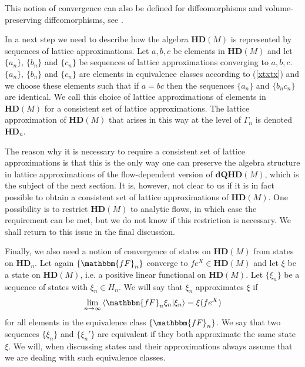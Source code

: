\documentclass[12pt]{article}
\def\x{\xi}
\def\G{\Gamma}
\begin{document}
This notion of convergence can also be defined for diffeomorphisms and volume-preserving diffeomorphisms, see \cite{Aastrup:2012vq}.


In a next step we need to describe how the algebra $\mathbf{HD}(M) $ is represented by sequences of lattice approximations. Let $a,b,c$ be elements in $\mathbf{HD}(M) $ and let $\{ a_n\}$, $\{ b_n\}$ and $\{ c_n\}$ be sequences of lattice approximations converging to $a,b,c$. $\{ a_n\}$, $\{ b_n\}$ and $\{ c_n\}$ are elements in equivalence classes according to (\ref{xtxtx}) and we choose these elements such that if
$
a = bc
$
then the sequences $\{  a_n \}$ and $\{b_n c_n\}$ are identical. We call this choice of lattice approximations of elements in $\mathbf{HD}(M) $ for a consistent set of lattice approximations. The lattice approximation of $\mathbf{HD}(M) $ that arises in this way at the level of $\G_n$ is denoted $\mathbf{HD}_n $. 

The reason why it is necessary to require a consistent set of lattice approximations is that this is the only way one can preserve the algebra structure in lattice approximations of the flow-dependent version of $\mathbf{dQHD}(M) $, which is the subject of the next section. It is, however, not clear to us if it is in fact possible to obtain a consistent set of lattice approximations of $\mathbf{HD}(M) $. One possibility is to restrict $\mathbf{HD}(M) $ to analytic flows, in which case the requirement can be met, but we do not know if this restriction is necessary. We shall return to this issue in the final discussion.








Finally, we also need a notion of convergence of states on $\mathbf{HD}(M) $ from states on $\mathbf{HD}_n $.
Let again $\{\mathbbm{fF}_n\}$ converge to $fe^X\in \mathbf{HD}(M) $ and let $\x$ be a state on $\mathbf{HD}(M) $, i.e. a positive linear functional on $\mathbf{HD}(M) $. Let $\{\x_n\}$ be a sequence of states with $\x_n\in H_n$. We will say that $\x_n$ approximates $\x$ if
$$
\lim_{n\rightarrow\infty}\left\langle \mathbbm{fF}_n \x_n\vert \x_n\right\rangle = \x(fe^X)
$$
for all elements in the equivalence class $\{\mathbbm{fF}_n\}$. We say that two sequences $\{\x_n\}$ and $\{\x_n'\}$ are equivalent if they both approximate the same state $\x$. We will, when discussing states and their approximations always assume that we are dealing with such equivalence classes. 
\end{document}
